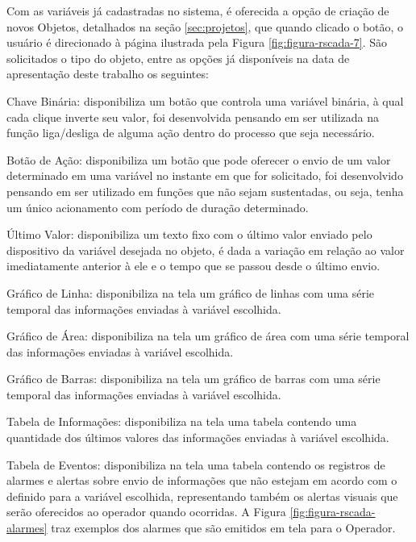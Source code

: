 Com as variáveis já cadastradas no sistema, é oferecida a opção de criação de novos Objetos, detalhados na seção \ref{sec:projetos}, que quando clicado o botão, o usuário é direcionado à página ilustrada pela Figura \ref{fig:figura-rscada-7}. São solicitados o tipo do objeto, entre as opções já disponíveis na data de apresentação deste trabalho os seguintes:

\begin{alineascomponto}
    \item Chave Binária: disponibiliza um botão que controla uma variável binária, à qual cada clique inverte seu valor, foi desenvolvida pensando em ser utilizada na função liga/desliga de alguma ação dentro do processo que seja necessário.
    \item Botão de Ação: disponibiliza um botão que pode oferecer o envio de um valor determinado em uma variável no instante em que for solicitado, foi desenvolvido pensando em ser utilizado em funções que não sejam sustentadas, ou seja, tenha um único acionamento com período de duração determinado.
    \item Último Valor: disponibiliza um texto fixo com o último valor enviado pelo dispositivo da variável desejada no objeto, é dada a variação em relação ao valor imediatamente anterior à ele e o tempo que se passou desde o último envio.
    \item Gráfico de Linha: disponibiliza na tela um gráfico de linhas com uma série temporal das informações enviadas à variável escolhida. 
    \item Gráfico de Área: disponibiliza na tela um gráfico de área com uma série temporal das informações enviadas à variável escolhida.
    \item Gráfico de Barras: disponibiliza na tela um gráfico de barras com uma série temporal das informações enviadas à variável escolhida.
    \item Tabela de Informações: disponibiliza na tela uma tabela contendo uma quantidade dos últimos valores das informações enviadas à variável escolhida.
    \item Tabela de Eventos:  disponibiliza na tela uma tabela contendo os registros de alarmes e alertas sobre envio de informações que não estejam em acordo com o definido para a variável escolhida, representando também os alertas visuais que serão oferecidos ao operador quando ocorridas. A Figura \ref{fig:figura-rscada-alarmes} traz exemplos dos alarmes que são emitidos em tela para o Operador.
\end{alineascomponto}

